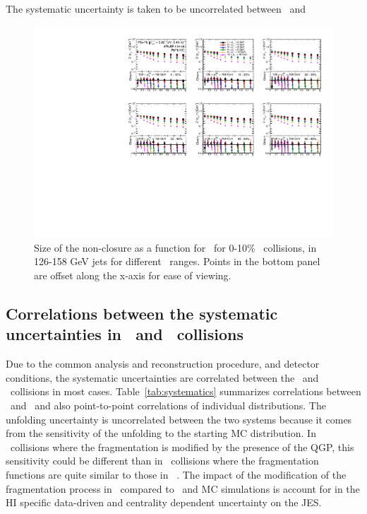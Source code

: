 The systematic uncertainty is taken to be uncorrelated between \pbpb\ and \pp 


\begin{figure}
\centerline{\includegraphics[page=1,width=1.\textwidth]{figures/main/systematics/ChPS_final_dR_PbPb_MC.pdf}}
    \caption{Size of the non-closure as a function for \rvar\ for 0-10\% \pbpb\ collisions, in 126-158 GeV jets for different \pttrk\ ranges.
Points in the bottom panel are offset along the x-axis for ease of viewing.}
    \label{fig:pbpbclosure}

\end{figure}
\subsection{Correlations between the systematic uncertainties in \pbpb\ and \pp\ collisions}

Due to the common analysis and reconstruction procedure, and detector conditions, the systematic uncertainties are correlated between the \pp\ and
\pbpb\ collisions in most cases.
Table~\ref{tab:systematics} summarizes correlations between \pp\ and \PbPb\ and also point-to-point correlations of individual distributions.
The unfolding uncertainty is uncorrelated between the two systems because it
comes from the sensitivity of the unfolding to the starting MC distribution.
In \pbpb\ collisions where the fragmentation is modified by the presence of the QGP, this sensitivity could be different than in \pp\ collisions where the fragmentation functions are quite similar to those in \pythiaeight~\cite{201865}.
The impact of the modification of the fragmentation process in \PbPb\ compared to \pp\ and MC simulations is account for in the HI specific data-driven and centrality dependent uncertainty on the JES.

